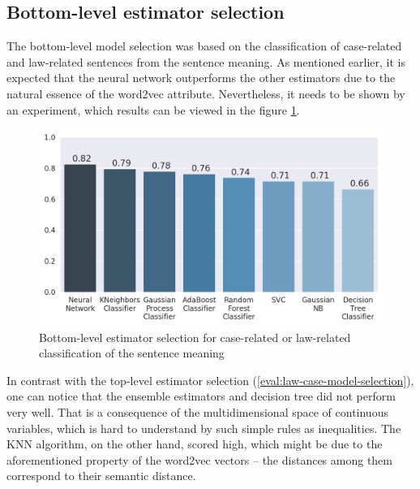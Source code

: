 \documentclass[
  digital, %
  notable,   %
  nolof,     %
  nolot,     %
]{fithesis3}
\begin{document}
\subsection{Bottom-level estimator selection}
\label{eval:bottom-model-selection}
The bottom-level model selection was based on the classification of case-related and law-related sentences from the sentence meaning.
As mentioned earlier, it is expected that the neural network outperforms the other estimators due to the natural essence of the word2vec attribute.
Nevertheless, it needs to be shown by an experiment, which results can be viewed in the figure \ref{fig:bottom_level_model_selection}.
\begin{figure}[h]
\caption{Bottom-level estimator selection for case-related or law-related classification of the sentence meaning}
\label{fig:bottom_level_model_selection}
\includegraphics[width=\textwidth]{img/bottom_level_model_selection}
\end{figure}

In contrast with the top-level estimator selection (\ref{eval:law-case-model-selection}), one can notice that the ensemble estimators and decision tree did not perform very well.
That is a consequence of the multidimensional space of continuous variables, which is hard to understand by such simple rules as inequalities.
The KNN algorithm, on the other hand, scored high, which might be due to the aforementioned property of the word2vec vectors -- the distances among them correspond to their semantic distance.
\end{document}
